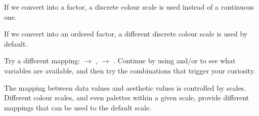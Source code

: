 \documentclass[krantz2]{krantz}\usepackage{knitr}%
\begin{document}
If we convert  into a factor, a discrete colour scale is used instead of a continuous one.

\begin{knitrout}\footnotesize
{}\color{fgcolor}\begin{kframe}
\begin{alltt}
\hlstd{(} 
       \hlstd{(}     \hlstd{=}  \hlopt{+}
  \hlstd{()}
\end{alltt}
\end{kframe}
\end{knitrout}

If we convert  into an ordered factor, a different discrete colour scale is used by default.

\begin{knitrout}\footnotesize
{}\color{fgcolor}\begin{kframe}
\begin{alltt}
\hlstd{(} 
       \hlstd{(}     \hlstd{=}  \hlopt{+}
  \hlstd{()}
\end{alltt}
\end{kframe}
\end{knitrout}

\begin{playground}
Try a different mapping:  $\rightarrow$ ,  $\rightarrow$ . Continue by using  and/or  to see what variables are available, and then try the combinations that trigger your curiosity.
\end{playground}

The mapping between data values and aesthetic values is controlled by scales. Different colour scales, and even palettes within a given scale, provide different mappings that can be used to the default scale.

\begin{knitrout}\footnotesize
{}\color{fgcolor}\begin{kframe}
\begin{alltt}
\hlstd{(} 
       \hlstd{(}     \hlstd{=}  \hlopt{+}
  \hlstd{()} \hlopt{+}
  \hlstd{(} \hlstd{=} \hlstd{,}  \hlstd{=} \hlstd{)}
\end{alltt}
\end{kframe}
\end{knitrout}
\end{document}
